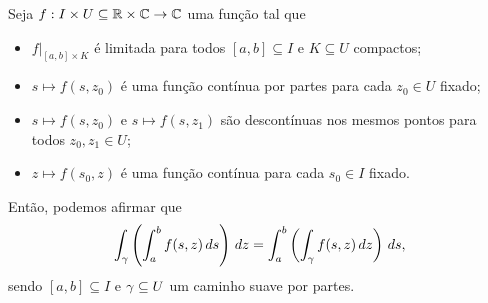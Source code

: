 %
\begin{teorema}
\label{teo-fubini-integrais-complexas}
Seja $f:I\times U \subseteq \mathbb{R}\times\mathbb{C} \to\mathbb{C}$ uma função tal que
%
\begin{itemize}
    \item $f\big|_{[a,b]\times K}$ é limitada para todos $[a,b]\subseteq I$ e $K\subseteq U$
    compactos;
    \item $s\mapsto f(s, z_0)$ é uma função contínua por partes para cada $z_0\in U$ fixado;
    \item $s\mapsto f(s, z_0)$ e $s\mapsto f(s, z_1)$ são descontínuas nos mesmos pontos
    para todos $z_0, z_1\in U$;
    \item $z\mapsto f(s_0, z)$ é uma função contínua para cada $s_0\in I$ fixado.
\end{itemize}
%
Então, podemos afirmar que
%
\[
\int_{\gamma} \left( \int_a^b f(s,z) \, ds \right) \, dz 
= \int_a^b \left( \int_{\gamma} f(s,z) \, dz \right) \, ds,
\]
%
sendo $[a,b]\subseteq I$ e $\gamma\subseteq U$ um caminho suave por partes.
\end{teorema}
%
